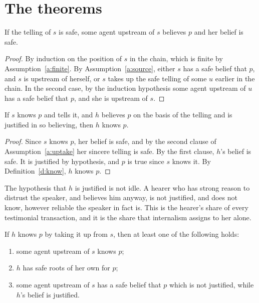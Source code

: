 \documentclass{situationist-preprint}
\begin{document}
\section{The theorems}

\begin{lemma}[Grounding]\label{l:ground}
If the telling of $s$ is safe, some agent upstream of $s$ believes $p$ and her belief is safe.
\end{lemma}

\begin{proof}
By induction on the position of $s$ in the chain, which is finite by Assumption~\ref{a:finite}. By Assumption~\ref{a:source}, either $s$ has a safe belief that $p$, and $s$ is upstream of herself, or $s$ takes up the safe telling of some $u$ earlier in the chain. In the second case, by the induction hypothesis some agent upstream of $u$ has a safe belief that $p$, and she is upstream of $s$.
\end{proof}

\begin{theorem}[Transmission]\label{t:trans}
If $s$ knows $p$ and tells it, and $h$ believes $p$ on the basis of the telling and is justified in so believing, then $h$ knows $p$.
\end{theorem}

\begin{proof}
Since $s$ knows $p$, her belief is safe, and by the second clause of Assumption~\ref{a:uptake} her sincere telling is safe. By the first clause, $h$'s belief is safe. It is justified by hypothesis, and $p$ is true since $s$ knows it. By Definition~\ref{d:know}, $h$ knows $p$.
\end{proof}

The hypothesis that $h$ is justified is not idle. A hearer who has strong reason to distrust the speaker, and believes him anyway, is not justified, and does not know, however reliable the speaker in fact is. This is the hearer's share of every testimonial transaction, and it is the share that internalism assigns to her alone.

\begin{theorem}[No generation]\label{t:nogen}
If $h$ knows $p$ by taking it up from $s$, then at least one of the following holds:
\begin{enumerate}[label=(\roman*)]
\item some agent upstream of $s$ knows $p$;
\item $h$ has safe roots of her own for $p$;
\item some agent upstream of $s$ has a safe belief that $p$ which is not justified, while $h$'s belief is justified.
\end{enumerate}
\end{theorem}
\end{document}
